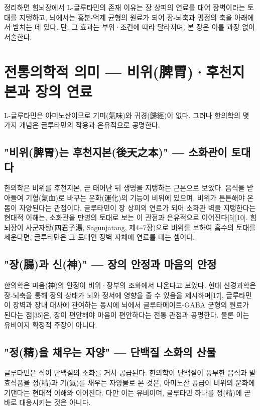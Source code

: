 \documentclass[12pt,oneside]{book}
\begin{document}
정리하면 힘뇌장에서 L-글루타민의 존재 이유는 장 상피의 연료를 대어 장벽이라는 토대를 지탱하고, 뇌에서는 흥분-억제 균형의 원료가 되어 장-뇌축과 평정의 축을 아래에서 받치는 데 있다. 단, 그 효과는 부위·조건에 따라 달라지며, 본 장은 이를 과장 없이 서술한다.

\section{전통의학적 의미 — 비위(脾胃)·후천지본과 장의 연료}

L-글루타민은 아미노산이므로 기미(氣味)와 귀경(歸經)이 없다. 그러나 한의학의 몇 가지 개념은 글루타민의 작용과 은유적으로 공명한다.

\subsection{"비위(脾胃)는 후천지본(後天之本)" — 소화관이 토대다}

한의학은 비위를 후천지본, 곧 태어난 뒤 생명을 지탱하는 근본으로 보았다. 음식을 받아들여 기혈(氣血)로 바꾸는 운화(運化)의 기능이 비위에 있으며, 비위가 튼튼해야 온몸이 자양된다는 관점이다. 글루타민이 장 상피의 연료가 되어 소화관 벽을 지탱한다는 현대적 이해는, 소화관을 만병의 토대로 보는 이 관점과 은유적으로 이어진다[5][10]. 힘뇌장이 사군자탕(四君子湯, Sagunjatang, 제4\textasciitilde{}7장)으로 비위를 보하여 흡수의 토대를 세운다면, 글루타민은 그 토대인 장벽 자체에 연료를 대는 셈이다.

\subsection{"장(腸)과 신(神)" — 장의 안정과 마음의 안정}

한의학은 마음(神)의 안정이 비위·장부의 조화에서 나온다고 보았다. 현대 신경과학은 장-뇌축을 통해 장의 상태가 뇌와 정서에 영향을 줄 수 있음을 제시하며[17], 글루타민이 장벽과 장내 대사에 관여하는 동시에 뇌에서 글루타메이트-GABA 균형의 원료가 된다는 점[35]은, 장이 편안해야 마음이 편안하다는 전통 관점과 공명한다. 물론 이는 유비이지 확정적 주장이 아니다.

\subsection{"정(精)을 채우는 자양" — 단백질 소화의 산물}

글루타민은 식이 단백질의 소화를 거쳐 공급된다. 한의학이 단백질이 풍부한 음식과 발효식품을 정(精)과 기(氣)를 채우는 자양물로 본 것은, 아미노산 공급이 비위의 운화에 기댄다는 현대적 이해와 이어진다. 다만 이는 유비이며, 글루타민 하나를 정(精)에 곧바로 대응시키는 것은 아니다.
\end{document}

